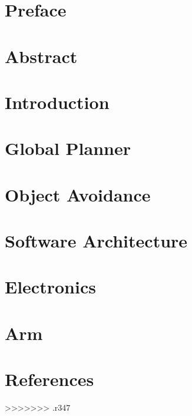 \documentclass[a4paper,10pt,titlepage]{report}
\begin{document}

\newpage


\newpage
{}

\newcommand{\todo}[1]{\textbf{\textsc{\textcolor{red}{[#1]}}}}

\chapter{Preface}

\label{preface}
\newpage

\chapter{Abstract}

\label{abstract}
\newpage

\tableofcontents

\chapter{Introduction}

\label{introduction}
\newpage

\newpage
\chapter{Global Planner}

\label{global_planner}

\newpage
\chapter{Object Avoidance}

\label{object_avoidance}

\newpage
\chapter{Software Architecture}
\label{Software Architecture}


\newpage
\chapter{Electronics}

\label{electronics}

\newpage
\chapter{Arm}

\label{arm}

\newpage
\chapter{References}
>>>>>>> .r347
\label{references}





\end{document}
